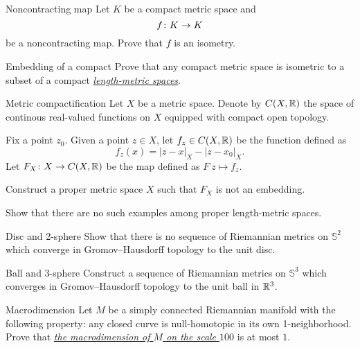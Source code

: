 \documentclass[twoside]{book}
\begin{document}
\begin{pr}{\easy}{Noncontracting map}\label{Noncontracting map}
Let $K$  be a compact metric space and
\[f\:K\z\to K\] 
be a noncontracting map.
Prove that $f$ is an isometry.
\end{pr}




\begin{pr}{\thm}{Embedding of a compact}\label{compact} 
Prove that any compact metric space 
is isometric to 
a subset of a compact \hyperref[Length-metric space]{\emph{length-metric spaces}}.
\end{pr}

\begin{pr}{\easy}{Metric compactification}\label{Metric compactification}
Let $X$ be a metric space.
Denote by $C(X,\mathbb{R})$ the space of continous real-valued functions on $X$ equipped with compact open topology.

Fix a point $z_0$.
Given a point $z\in X$, let $f_z\in C(X,\mathbb{R})$ be the function defined as 
\[f_z(x)=|z-x|_X-|z-x_0|_X.\]
Let $F_X\colon X\to C(X,\mathbb{R})$ be the map 
defined as $F\:z\mapsto f_z$.

Construct a proper metric space $X$
such that $F_X$ is not an embedding.

Show that there are no such examples among proper length-metric spaces.
\end{pr}




\begin{pr}{}{Disc and 2-sphere}\label{2-sphere is far from a ball}
Show that there is no sequence of Riemannian metrics on
$\mathbb{S}^2$ which converge in Gromov--Hausdorff topology to the unit disc.
\end{pr}


\begin{pr}{}{Ball and 3-sphere}\label{3-sphere is close to a ball}
Construct a sequence of Riemannian metrics on $\mathbb{S}^3$ 
which converges in Gromov--Hausdorff topology 
to the unit ball in $\mathbb{R}^3$.
\end{pr}

\begin{pr}{\easy}{Macrodimension}\label{macrodimension} 
Let $M$ be a simply connected Riemannian manifold with the following property: 
any closed curve is null-homotopic 
in its own  1-neighborhood. 
Prove that \hyperref[Macrodimension]{\emph{the macrodimension of $M$ on the scale $100$}} is at most $1$.
\end{pr}
\end{document}

